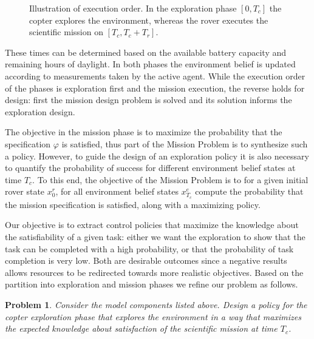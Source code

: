 \documentclass[conference]{IEEEtran}
\newtheorem{problem}{Problem}
\begin{document}
\begin{figure}
	\centering
	\caption{Illustration of execution order. In the exploration phase $[0, T_c]$ the copter explores the environment, whereas the rover executes the scientific mission on $[T_c, T_c + T_r]$.}	
	\label{fig:execorder}
\end{figure}

These times can be determined based on the available battery capacity and remaining hours of daylight. In both phases the environment belief is updated according to measurements taken by the active agent. While the execution order of the phases is exploration first and the mission execution, the reverse holds for design: first the mission design problem is solved and its solution informs the exploration design.

\smallskip
{} The objective in the mission phase is to maximize the probability that the specification $\varphi$ is satisfied, thus part of the Mission Problem is to synthesize such a policy. However, to guide the design of an exploration policy it is also necessary to quantify the probability of success for different environment belief states at time $T_c$. To this end, the objective of the Mission Problem is to for a given initial rover state $x^r_{0}$, for all environment belief states $x^e_{T_c}$ compute the probability that the mission specification is satisfied, along with a maximizing policy.

\smallskip
{} Our objective is to extract control policies that maximize the knowledge about the satisfiability of a given task: either we want the exploration to show that the task can be completed with a high probability, or that the probability of task completion is very low. Both are desirable outcomes since a negative results allows resources to be redirected towards more realistic objectives. Based on the partition into exploration and mission phases we refine our problem as follows.
\begin{problem}
\label{prob:main}
  Consider the model components listed above. Design a policy for the copter exploration phase that explores the environment in a way that maximizes the expected knowledge about satisfaction of the scientific mission at time $T_c$.
\end{problem}
\end{document}
